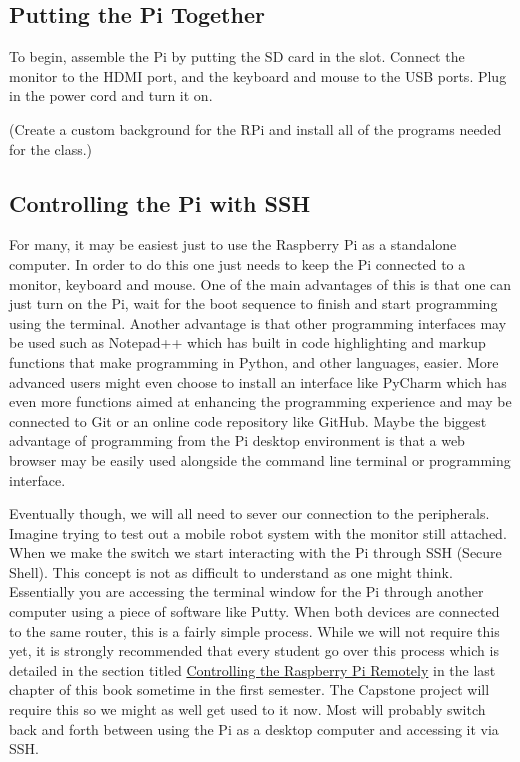 \documentclass[
]{book}
\begin{document}
\hypertarget{putting-the-pi-together}{%
\subsection{Putting the Pi Together}\label{putting-the-pi-together}}

To begin, assemble the Pi by putting the SD card in the slot. Connect the monitor to the HDMI port, and the keyboard and mouse to the USB ports. Plug in the power cord and turn it on.

(Create a custom background for the RPi and install all of the programs needed for the class.)

\hypertarget{controlling-the-pi-with-ssh}{%
\subsection{Controlling the Pi with SSH}\label{controlling-the-pi-with-ssh}}

For many, it may be easiest just to use the Raspberry Pi as a standalone computer. In order to do this one just needs to keep the Pi connected to a monitor, keyboard and mouse. One of the main advantages of this is that one can just turn on the Pi, wait for the boot sequence to finish and start programming using the terminal. Another advantage is that other programming interfaces may be used such as Notepad++ which has built in code highlighting and markup functions that make programming in Python, and other languages, easier. More advanced users might even choose to install an interface like PyCharm which has even more functions aimed at enhancing the programming experience and may be connected to Git or an online code repository like GitHub. Maybe the biggest advantage of programming from the Pi desktop environment is that a web browser may be easily used alongside the command line terminal or programming interface.

Eventually though, we will all need to sever our connection to the peripherals. Imagine trying to test out a mobile robot system with the monitor still attached. When we make the switch we start interacting with the Pi through SSH (Secure Shell). This concept is not as difficult to understand as one might think. Essentially you are accessing the terminal window for the Pi through another computer using a piece of software like Putty. When both devices are connected to the same router, this is a fairly simple process. While we will not require this yet, it is strongly recommended that every student go over this process which is detailed in the section titled \protect\hyperlink{controlling-the-raspberry-pi-remotely}{Controlling the Raspberry Pi Remotely} in the last chapter of this book sometime in the first semester. The Capstone project will require this so we might as well get used to it now. Most will probably switch back and forth between using the Pi as a desktop computer and accessing it via SSH.
\end{document}
